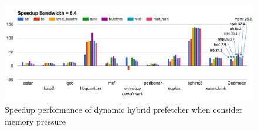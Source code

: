 \begin{figure}[ht!]
   \centering
   \includegraphics[width=1.0\textwidth]{images/final_speedup_mem.png}
   \caption{Speedup performance of dynamic hybrid prefetcher when consider memory pressure}
   \label{fig:final_speedup_mem}
\end{figure}
